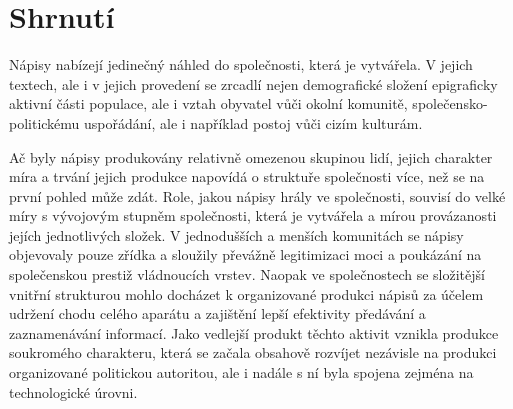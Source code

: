 
\section[shrnutí]{Shrnutí}

Nápisy nabízejí jedinečný náhled do společnosti, která je vytvářela. V jejich textech, ale i v jejich provedení se zrcadlí nejen demografické složení epigraficky aktivní části populace, ale i vztah obyvatel vůči okolní komunitě, společensko-politickému uspořádání, ale i například postoj vůči cizím kulturám.

Ač byly nápisy produkovány relativně omezenou skupinou lidí, jejich charakter míra a trvání jejich produkce napovídá o struktuře společnosti více, než se na první pohled může zdát. Role, jakou nápisy hrály ve společnosti, souvisí do velké míry s vývojovým stupněm společnosti, která je vytvářela a mírou provázanosti jejích jednotlivých složek. V jednodušších a menších komunitách se nápisy objevovaly pouze zřídka a sloužily převážně legitimizaci moci a poukázání na společenskou prestiž vládnoucích vrstev. Naopak ve společnostech se složitější vnitřní strukturou mohlo docházet k organizované produkci nápisů za účelem udržení chodu celého aparátu a zajištění lepší efektivity předávání a zaznamenávání informací. Jako vedlejší produkt těchto aktivit vznikla produkce soukromého charakteru, která se začala obsahově rozvíjet nezávisle na produkci organizované politickou autoritou, ale i nadále s ní byla spojena zejména na technologické úrovni.

